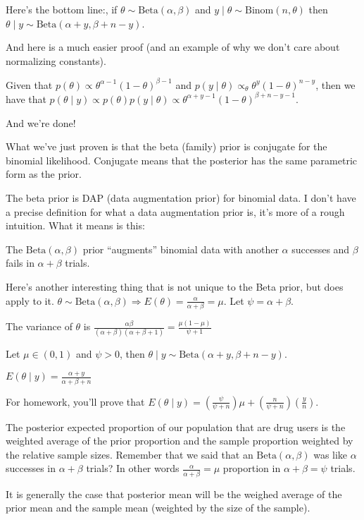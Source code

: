 \documentclass[a4paper]{article}
\begin{document}
Here's the bottom line:, if $\theta \sim \text{Beta}(\alpha, \beta)$ and $y \mid \theta \sim \text{Binom}(n, \theta)$ then $\theta \mid y \sim \text{Beta}(\alpha + y, \beta + n - y)$.

And here is a much easier proof (and an example of why we don't care about normalizing constants).

Given that $p(\theta) \propto \theta ^{\alpha - 1} (1 - \theta) ^{\beta - 1}$ and $p(y \mid \theta) \propto _\theta \theta ^y (1 - \theta) ^{n - y}$, then we have that $p(\theta \mid y) \propto p(\theta) p(y \mid \theta) \propto \theta ^{\alpha + y - 1} (1 - \theta) ^{\beta + n - y - 1}$.

And we're done!

What we've just proven is that the beta (family) prior is conjugate for the
binomial likelihood. Conjugate means that the posterior has the same parametric
form as the prior.

The beta prior is DAP (data augmentation prior) for binomial data. I don't have
a precise definition for what a data augmentation prior is, it's more of a
rough intuition. What it means is this:

The $\text{Beta}(\alpha, \beta)$ prior ``augments'' binomial data with another
$\alpha$ successes and $\beta$ fails in $\alpha + \beta$ trials.

Here's another interesting thing that is not unique to the Beta prior, but does apply to it. $\theta \sim \text{Beta}(\alpha, \beta) \Rightarrow E(\theta) = \frac{\alpha}{\alpha + \beta} = \mu$. Let $\psi = \alpha + \beta$.

The variance of $\theta$ is $\frac{\alpha\beta}{(\alpha + \beta)(\alpha + \beta + 1)} = \frac{\mu (1 - \mu)}{\psi + 1}$

Let $\mu \in (0, 1)$ and $\psi > 0$, then $\theta \mid y \sim \text{Beta}(\alpha + y, \beta + n - y)$.

$E(\theta \mid y) = \frac{\alpha + y}{\alpha + \beta + n}$

For homework, you'll prove that $E(\theta \mid y) = (\frac{\psi}{\psi + n})\mu + (\frac{n}{\psi + n})(\frac{y}{n})$.

The posterior expected proportion of our population that are drug users is the
weighted average of the prior proportion and the sample proportion weighted by
the relative sample sizes. Remember that we said that an $\text{Beta}(\alpha,
\beta)$ was like $\alpha$ successes in $\alpha + \beta$ trials? In other words
$\frac{\alpha}{\alpha + \beta} = \mu$ proportion in $\alpha + \beta = \psi$
trials.

It is generally the case that posterior mean will be the weighed average of the
prior mean and the sample mean (weighted by the size of the sample).
\end{document}
